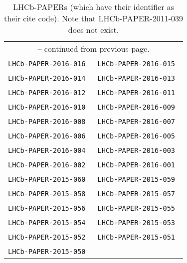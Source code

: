 \begin{center}
\begin{longtable}{ll}
\caption{\small
  LHCb-PAPERs (which have their identifier as their cite code).  
  Note that LHCb-PAPER-2011-039 does not exist.
}
\label{tab:LHCb-PAPERs}
\endfirsthead
\multicolumn{2}{c}{ -- continued from previous page.}
\endhead
\endfoot
\endlastfoot
\hline
& \texttt{LHCb-PAPER-2016-017}~\cite{LHCb-PAPER-2016-017} \\
\texttt{LHCb-PAPER-2016-016}~\cite{LHCb-PAPER-2016-016} &
\texttt{LHCb-PAPER-2016-015}~\cite{LHCb-PAPER-2016-015} \\
\texttt{LHCb-PAPER-2016-014}~\cite{LHCb-PAPER-2016-014} &
\texttt{LHCb-PAPER-2016-013}~\cite{LHCb-PAPER-2016-013} \\
\texttt{LHCb-PAPER-2016-012}~\cite{LHCb-PAPER-2016-012} &
\texttt{LHCb-PAPER-2016-011}~\cite{LHCb-PAPER-2016-011} \\
\texttt{LHCb-PAPER-2016-010}~\cite{LHCb-PAPER-2016-010} &
\texttt{LHCb-PAPER-2016-009}~\cite{LHCb-PAPER-2016-009} \\
\texttt{LHCb-PAPER-2016-008}~\cite{LHCb-PAPER-2016-008} &
\texttt{LHCb-PAPER-2016-007}~\cite{LHCb-PAPER-2016-007} \\
\texttt{LHCb-PAPER-2016-006}~\cite{LHCb-PAPER-2016-006} &
\texttt{LHCb-PAPER-2016-005}~\cite{LHCb-PAPER-2016-005} \\
\texttt{LHCb-PAPER-2016-004}~\cite{LHCb-PAPER-2016-004} &
\texttt{LHCb-PAPER-2016-003}~\cite{LHCb-PAPER-2016-003} \\
\texttt{LHCb-PAPER-2016-002}~\cite{LHCb-PAPER-2016-002} &
\texttt{LHCb-PAPER-2016-001}~\cite{LHCb-PAPER-2016-001} \\
\hline
\texttt{LHCb-PAPER-2015-060}~\cite{LHCb-PAPER-2015-060} &
\texttt{LHCb-PAPER-2015-059}~\cite{LHCb-PAPER-2015-059} \\
\texttt{LHCb-PAPER-2015-058}~\cite{LHCb-PAPER-2015-058} &
\texttt{LHCb-PAPER-2015-057}~\cite{LHCb-PAPER-2015-057} \\
\texttt{LHCb-PAPER-2015-056}~\cite{LHCb-PAPER-2015-056} &
\texttt{LHCb-PAPER-2015-055}~\cite{LHCb-PAPER-2015-055} \\
\texttt{LHCb-PAPER-2015-054}~\cite{LHCb-PAPER-2015-054} &
\texttt{LHCb-PAPER-2015-053}~\cite{LHCb-PAPER-2015-053} \\
\texttt{LHCb-PAPER-2015-052}~\cite{LHCb-PAPER-2015-052} &
\texttt{LHCb-PAPER-2015-051}~\cite{LHCb-PAPER-2015-051} \\
\texttt{LHCb-PAPER-2015-050}~\cite{LHCb-PAPER-2015-050} &

\end{longtable}
\end{center}
